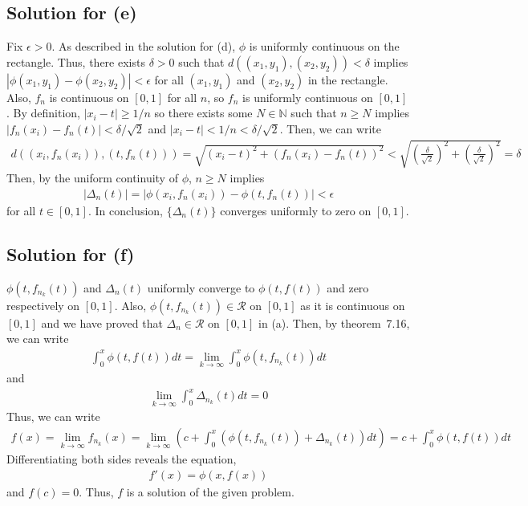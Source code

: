 \documentclass{scrartcl}
\begin{document}
\subsection{Solution for (e)}
Fix \(\epsilon > 0\). As described in the solution for (d), \(\phi\) is
uniformly continuous on the rectangle. Thus, there exists \(\delta > 0\) such
that \(d((x_1, y_1), (x_2, y_2)) < \delta\) implies \(|\phi(x_1, y_1) -
\phi(x_2, y_2)| < \epsilon\) for all \((x_1, y_1)\) and \((x_2, y_2)\) in the
rectangle. Also, \(f_n\) is continuous on \([0, 1]\) for all \(n\), so \(f_n\)
is uniformly continuous on \([0, 1]\). By definition, \(|x_i - t| \ge 1 / n\)
so there exists some \(N \in \mathbb{N}\) such that \(n \ge N\) implies
\(|f_n(x_i) - f_n(t)| < \delta / \sqrt{2}\) and \(|x_i - t| < 1 / n < \delta /
\sqrt{2}\). Then, we can write
\begin{align*}
  d((x_i, f_n(x_i)), (t, f_n(t)))
  = \sqrt{(x_i - t)^2 + (f_n(x_i) - f_n(t))^2}
  < \sqrt{\left( \frac{\delta}{\sqrt{2}} \right)^2
    + \left( \frac{\delta}{\sqrt{2}} \right)^2}
  = \delta
\end{align*}
Then, by the uniform continuity of \(\phi\), \(n \ge N\) implies
\begin{align*}
  |\Delta_n(t)|
  = |\phi(x_i, f_n(x_i)) - \phi(t, f_n(t))|
  < \epsilon
\end{align*}
for all \(t \in [0, 1]\). In conclusion, \(\{\Delta_n(t)\}\) converges
uniformly to zero on \([0, 1]\).

\subsection{Solution for (f)}
\(\phi(t, f_{n_k}(t))\) and \(\Delta_n(t)\) uniformly converge to \(\phi(t,
f(t))\) and zero respectively on \([0, 1]\). Also, \(\phi(t, f_{n_k}(t)) \in
\mathscr{R}\) on \([0, 1]\) as it is continuous on \([0, 1]\) and we have
proved that \(\Delta_n \in \mathscr{R}\) on \([0, 1]\) in (a). Then, by
theorem~7.16, we can write
\begin{align*}
  \int^x_0 \phi(t, f(t)) dt
  = \lim_{k \to \infty} \int^x_0 \phi(t, f_{n_k}(t)) dt
\end{align*}
and
\begin{align*}
  \lim_{k \to \infty} \int^x_0 \Delta_{n_k}(t) dt = 0
\end{align*}
Thus, we can write
\begin{align*}
  f(x)
  = \lim_{k \to \infty} f_{n_k}(x)
  = \lim_{k \to \infty} \left( c + \int^x_0 (\phi(t, f_{n_k}(t))
    + \Delta_{n_k}(t)) dt \right)
  = c + \int^x_0 \phi(t, f(t)) dt
\end{align*}
Differentiating both sides reveals the equation,
\begin{align*}
  f'(x) = \phi(x, f(x))
\end{align*}
and \(f(c) = 0\). Thus, \(f\) is a solution of the given problem.
\end{document}
